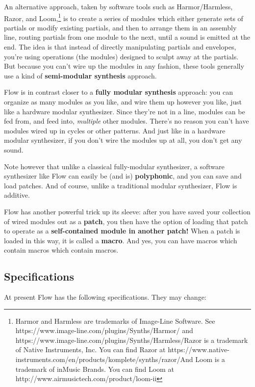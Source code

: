 \documentclass{article}
\newcommand\name{Flow}
\begin{document}
An alternative approach, taken by software tools such as Harmor/Harmless, Razor, and Loom,\footnote{Harmor and Harmless are trademarks of Image-Line Software.  See https:/\!/www.image-line.com/plugins/Synths/Harmor/  and https:/\!/www.image-line.com/plugins/Synths/Harmless/\qquad Razor is a trademark of Native Instruments, Inc.  You can find Razor at https:/\!/www.native-instruments.com/en/products/komplete/synths/razor/\qquad And Loom is a trademark of inMusic Brands.  You can find Loom at http:/\!/www.airmusictech.com/product/loom-ii}
is to create a series of modules which either generate sets of partials or modify existing partials, and then to arrange them in an assembly line, routing partials from one module to the next, until a sound is emitted at the end.  The idea is that instead of directly manipulating partials and envelopes, you're using operations (the modules) designed to sculpt away at the partials.  But because you can't wire up the modules in any fashion, these tools generally use a kind of {\bf semi-modular synthesis} approach.  

{\name} is in contrast closer to a {\bf fully modular synthesis} approach: you can organize as many modules as you like, and wire them up however you like, just like a hardware modular synthesizer. Since they're not in a line, modules can be fed from, and feed into, {\it multiple} other modules.  There's no reason you can't have modules wired up in cycles or other patterns.  And just like in a hardware modular synthesizer, if you don't wire the modules up at all, you don't get any sound. 

Note however that unlike a classical fully-modular synthesizer, a software synthesizer like {\name} can easily be (and is) {\bf polyphonic}, and you can save and load patches.  And of course, unlike a traditional modular synthesizer, {\name} is additive.

{\name} has another powerful trick up its sleeve: after you have saved your collection of wired modules out as a {\bf patch}, you then have the option of loading that patch to operate as a {\bf self-contained module in another patch!}  When a patch is loaded in this way, it is called a {\bf macro}.  And yes, you can have macros which contain macros which contain macros.


\subsection{Specifications}

At present {\name} has the following specifications.  They may change:
\end{document}
